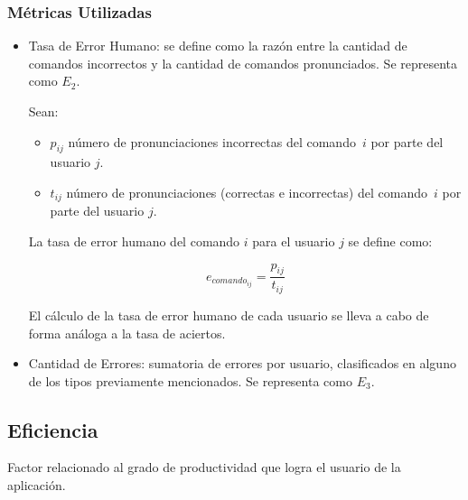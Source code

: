 \subsubsection{M\'etricas Utilizadas}
\begin{itemize}
	\item Tasa de Error Humano: se define como la raz\'on entre la cantidad de comandos incorrectos
	y la cantidad de comandos pronunciados. Se representa como $E_2$.
	
	Sean:

	\begin{itemize}
		\item $p_{ij}$ n\'umero de pronunciaciones incorrectas del \mbox{comando $i$} por parte del usuario $j$.
		\item $t_{ij}$ n\'umero de pronunciaciones (correctas e incorrectas) del \mbox{comando $i$} por parte del usuario $j$.
	\end{itemize}
	La tasa de error humano del comando $i$ para el usuario $j$ se define como: 

	\begin{equation*}
		e_{{comando}_{ij}}=\frac{p_{ij}}{t_{ij}}
	\end{equation*}

	El c\'alculo de la tasa de error humano de cada usuario se lleva a cabo de forma an\'aloga 
	a la tasa de aciertos.

	\item Cantidad de Errores: sumatoria de errores por usuario, clasificados en
	alguno de los tipos previamente mencionados. Se representa como $E_3$.

\end{itemize}

\subsection{Eficiencia}
Factor relacionado al grado de productividad que logra el usuario de la aplicaci\'on.

